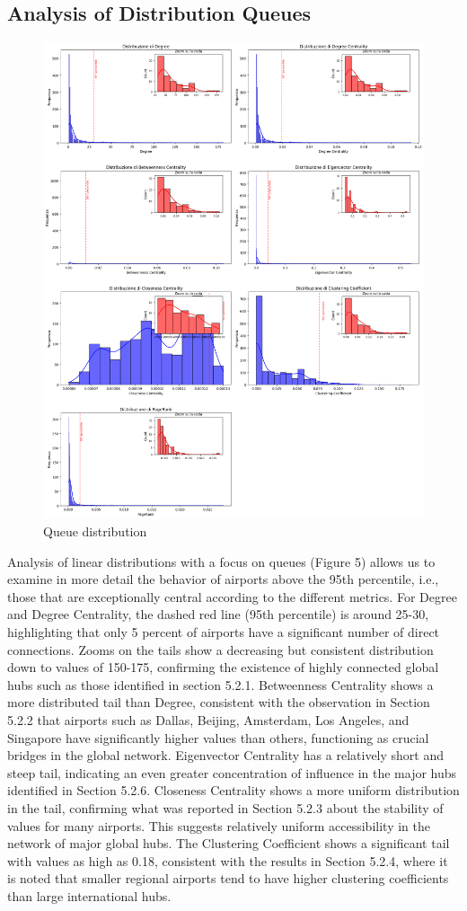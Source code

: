 \documentclass[12pt]{article}
\begin{document}
    \subsection{Analysis of Distribution Queues}
    \begin{figure}[H]
        \centering
        \includegraphics[width=0.8\linewidth]{img/distribution_queues.png}
        \caption{Queue distribution}
    \end{figure}
    Analysis of linear distributions with a focus on queues (Figure 5) allows us to examine in more detail the behavior of airports above the 95th percentile, i.e., those that are exceptionally central according to the different metrics.
    For Degree and Degree Centrality, the dashed red line (95th percentile) is around 25-30, highlighting that only 5 percent of airports have a significant number of direct connections. Zooms on the tails show a decreasing but consistent distribution down to values of 150-175, confirming the existence of highly connected global hubs such as those identified in section 5.2.1.
    Betweenness Centrality shows a more distributed tail than Degree, consistent with the observation in Section 5.2.2 that airports such as Dallas, Beijing, Amsterdam, Los Angeles, and Singapore have significantly higher values than others, functioning as crucial bridges in the global network.
    Eigenvector Centrality has a relatively short and steep tail, indicating an even greater concentration of influence in the major hubs identified in Section 5.2.6.
    Closeness Centrality shows a more uniform distribution in the tail, confirming what was reported in Section 5.2.3 about the stability of values for many airports. This suggests relatively uniform accessibility in the network of major global hubs.
    The Clustering Coefficient shows a significant tail with values as high as 0.18, consistent with the results in Section 5.2.4, where it is noted that smaller regional airports tend to have higher clustering coefficients than large international hubs.
\end{document}
